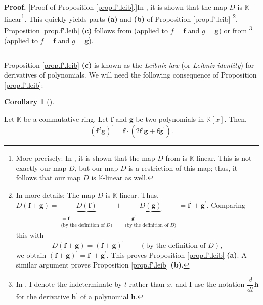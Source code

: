 \documentclass[numbers=enddot,12pt,final,onecolumn,notitlepage]{scrartcl}%
\theoremstyle{definition}
\newtheorem{coro}[theo]{Corollary}
\newenvironment{corollary}[1][]
{\begin{coro}[#1]\begin{leftbar}}
{\end{leftbar}\end{coro}}
\newenvironment{proof}[1][Proof]{\noindent\textbf{#1.} }{\ \rule{0.5em}{0.5em}}
\begin{document}
\begin{proof}
[Proof of Proposition \ref{prop.f'.leib}.]In \cite[Exercise 5 \textbf{(b)}%
]{19s-mt3s}, it is shown that the map $D$ is $\mathbb{K}$-linear\footnote{More
precisely: In \cite[Exercise 5 \textbf{(b)}]{19s-mt3s}, it is shown that the
map $D$ from \cite[Exercise 5]{19s-mt3s} is $\mathbb{K}$-linear. This is not
exactly our map $D$, but our map $D$ is a restriction of this map; thus, it
follows that our map $D$ is $\mathbb{K}$-linear as well.}. This quickly yields
parts \textbf{(a)} and \textbf{(b)} of Proposition \ref{prop.f'.leib}%
\footnote{In more details: The map $D$ is $\mathbb{K}$-linear. Thus, $D\left(
\mathbf{f}+\mathbf{g}\right)  =\underbrace{D\left(  \mathbf{f}\right)
}_{\substack{=\mathbf{f}^{\prime}\\\text{(by the definition of }D\text{)}%
}}+\underbrace{D\left(  \mathbf{g}\right)  }_{\substack{=\mathbf{g}^{\prime
}\\\text{(by the definition of }D\text{)}}}=\mathbf{f}^{\prime}+\mathbf{g}%
^{\prime}$. Comparing this with%
\[
D\left(  \mathbf{f}+\mathbf{g}\right)  =\left(  \mathbf{f}+\mathbf{g}\right)
^{\prime}\ \ \ \ \ \ \ \ \ \ \left(  \text{by the definition of }D\right)  ,
\]
we obtain $\left(  \mathbf{f}+\mathbf{g}\right)  ^{\prime}=\mathbf{f}^{\prime
}+\mathbf{g}^{\prime}$. This proves Proposition \ref{prop.f'.leib}
\textbf{(a)}. A similar argument proves Proposition \ref{prop.f'.leib}
\textbf{(b)}.}. Proposition \ref{prop.f'.leib} \textbf{(c)} follows from
\cite[Exercise 5 \textbf{(c)}]{19s-mt3s} (applied to $f=\mathbf{f}$ and
$g=\mathbf{g}$) or from \cite[Proposition 0.2 \textbf{(c)}]{Grinbe18}%
\footnote{In \cite{Grinbe18}, I denote the indeterminate by $t$ rather than
$x$, and I use the notation $\dfrac{d}{dt}\mathbf{h}$ for the derivative
$\mathbf{h}^{\prime}$ of a polynomial $\mathbf{h}$.} (applied to
$f=\mathbf{f}$ and $g=\mathbf{g}$).
\end{proof}

Proposition \ref{prop.f'.leib} \textbf{(c)} is known as the \textit{Leibniz
law} (or \textit{Leibniz identity}) for derivatives of polynomials. We will
need the following consequence of Proposition \ref{prop.f'.leib}:

\begin{corollary}
\label{cor.f'.leib2}Let $\mathbb{K}$ be a commutative ring. Let $\mathbf{f}$
and $\mathbf{g}$ be two polynomials in $\mathbb{K}\left[  x\right]  $. Then,%
\[
\left(  \mathbf{f}^{2}\mathbf{g}\right)  ^{\prime}=\mathbf{f}\cdot\left(
2\mathbf{f}^{\prime}\mathbf{g}+\mathbf{fg}^{\prime}\right)  .
\]

\end{corollary}
\end{document}
